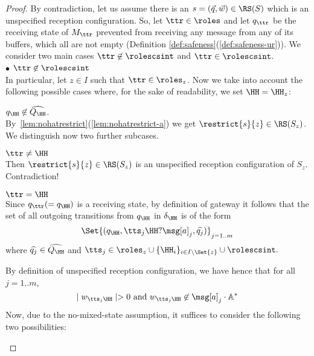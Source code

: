 \begin{proof}
By contradiction, let us assume there is an $s= (\vec{q},\vec{w})\in \RS(S)$ which is an unspecified reception configuration.
So, let $\ttr \in \roles$ and let ${q}_\ttr$  be the receiving state of $M_\ttr$ prevented from 
receiving any message from any of its buffers, which all are not empty (Definition \ref{def:safeness}(\ref{def:safeness-ur})).
We consider two main cases $\ttr \not\in\rolescsint$ and  $\ttr\in\rolescsint$.\\[2mm]
$\bullet$ $\ttr \not\in\rolescsint$\\
In particular, let $z\in I$ such that $\ttr \in \roles_z$. Now we  take into account the following possible cases where, for the sake of readability,
we set $\HH=\HH_z$:

\begin{description}
\item 
${q}_\HH\not\in \widehat{Q_\HH}$.\\ 
By~\cref{lem:nohatrestrict}(\ref{lem:nohatrestrict-a}) we get $\restrict{s}{z}\in \RS(S_z)$.
We distinguish now two further subcases.
\begin{description}
\item 
$\ttr \neq \HH$\\
Then $\restrict{s}{z}\in \RS(S_z)$ is an unspecified reception configuration of
$S_z$. Contradiction!
\item 
$\ttr = \HH$\\
Since ${q}_\ttr(= {q}_\HH)$ is a receiving state,
by definition of gateway it follows that
 the set
of all outgoing transitions from $q_\HH$ in $\delta_\HH$ is of the form 
$$\Set{({q}_\HH,\tts_j\HH?\msg[a]_j,\widehat{q_j})}_{j=1..m}$$
where $\widehat{q_j}\in  \widehat{Q_\HH}$ and 
 $\tts_j \in \roles_z \cup \{\HH_i\}_{i \in I\setminus\Set{z}}\cup\rolescsint.$

By definition of unspecified reception configuration,  we have hence that for all $j=1..m$, 
\begin{equation} \label{eq:wur}
\mid w_{\tts_j\HH}\mid > 0 
\text{ and } w_{\tts_j\HH}\not\in  \msg[a]_j \cdot \mathbb{A}^*  %
\end{equation}
Now, due to the no-mixed-state assumption, it suffices to
consider the following two possibilities:\\


\end{description}
\end{description}
\end{proof}
